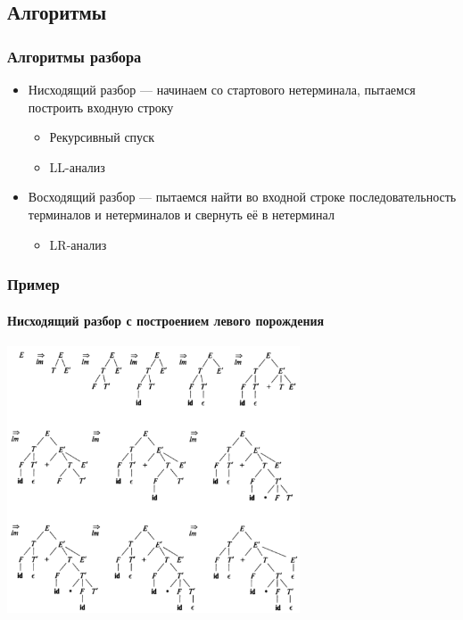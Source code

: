 \documentclass[xetex,mathserif,serif]{beamer}
\begin{document}
    \subsection{Алгоритмы}

    \begin{frame}
        \frametitle{Алгоритмы разбора}
        \begin{itemize}
            \item Нисходящий разбор --- начинаем со стартового нетерминала, пытаемся построить входную строку
            \begin{itemize}
                \item Рекурсивный спуск
                \item LL-анализ
            \end{itemize}
            \item Восходящий разбор --- пытаемся найти во входной строке последовательность терминалов и нетерминалов и свернуть её в нетерминал
            \begin{itemize}
                \item LR-анализ
            \end{itemize}
        \end{itemize}
    \end{frame}

    \begin{frame}
        \frametitle{Пример}
        \framesubtitle{Нисходящий разбор с построением левого порождения}
        \begin{center}
            \includegraphics[width=0.65\textwidth]{topDownAnalysis.png}
        \end{center}
    \end{frame}
\end{document}
